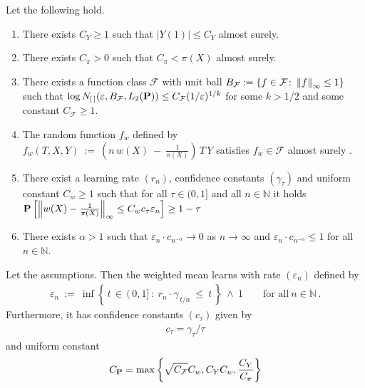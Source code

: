 \begin{assumptions*}
  Let the following hold.
  \begin{enumerate}[label={(\roman*)}]
    \item
      There exists $C_Y\ge 1$ such that $|Y(1)|\le C_Y$ almost surely. 
    \item
      There exists $C_\pi > 0$ such that $C_\pi < \pi(X)$ almost surely.
    \item
      There exists a function class $\mathcal{F}$ 
      with unit ball 
      $
        B_\mathcal{F}
        :=
        \left\{ 
          f\in \mathcal{F}
          \colon
          \norm{f}_\infty
          \le 
          1
        \right\}
      $
      such that  
      $
          \log N_{[\,]}(\varepsilon, B_\mathcal{F}, L_2(\P))
        \le
        C_{\mathcal{F}}
        (1/\varepsilon)^{1/k} 
      $
      for some $k>1/2$ and some constant $C_\mathcal{F}\ge 1$.
    \item
      The random function $f_w$ defined by
      $
  f_w(T,X,Y)
  \ 
  :=
  \ 
  \left( 
   n\, w(X)
    \ 
    -
    \ 
    \frac{1}{\pi(X)}
  \right)
  \,
  T
  \,
  Y
      $
      satisfies
      $f_w\in \mathcal{F}$
      almost surely
      .
  \item 
    There exist a learning rate 
    $
    (r_n)
    $,
    confidence constants
    $
    (\gamma_\tau)
    $
    and 
    uniform constant
    $
    C_w\ge 1
    $
    such that
    for all $\tau \in(0,1]$
    and all $n \in \mathbb{N}$
    it holds
    $
    \P
    \left[ 
    \norm{w(X) - \frac{1}{\pi(X)}}_\infty
    \le
    C_w
    c_\tau
    \varepsilon_n
    \right]
    \ge 
    1-\tau
    $
    \item
      There exists $\alpha > 1$ 
  such that 
  $
  \varepsilon_n \cdot c_{n^{-\alpha}}
  \to 
  0
  $
  as 
  $
  n\to \infty
  $
  and 
  $
  \varepsilon_n \cdot c_{n^{-\alpha}}
  \le 
  1
  $
  for all 
  $n \in \mathbb{N}$.
  \end{enumerate}
\end{assumptions*}
\begin{theorem*}
  Let the assumptions.
  Then the weighted mean learns with rate
  $
    (\varepsilon_n)
  $
  defined by
  \begin{gather*}
    \varepsilon_n
    \ 
    :=
    \ 
    \inf
    \left\{ \,t \,\in\,  (\,0,1]
      \ 
      \colon
      \ 
  r_n \cdot \gamma_{\,t/n}
  \ 
  \le
  \ 
  t
  \,
    \right\}
    \ 
    \land 
    \ 
    1
    \qquad
    \text{for all}
    \ 
    n\in \mathbb{N}
    \,.
  \end{gather*}
  Furthermore, it has confidence constants
  $
  (c_\tau)
  $
  given by
\begin{gather}
  c_\tau = \gamma_\tau /\tau
\end{gather}
  and uniform constant
  \begin{gather}
C_\P    
=
\max
\left\{ 
  \sqrt{C_\mathcal{F}}
  C_w
  ,
  C_Y
  C_w
  ,
  \frac{C_Y}{C_\pi}
\right\}
  \end{gather}
\end{theorem*}

